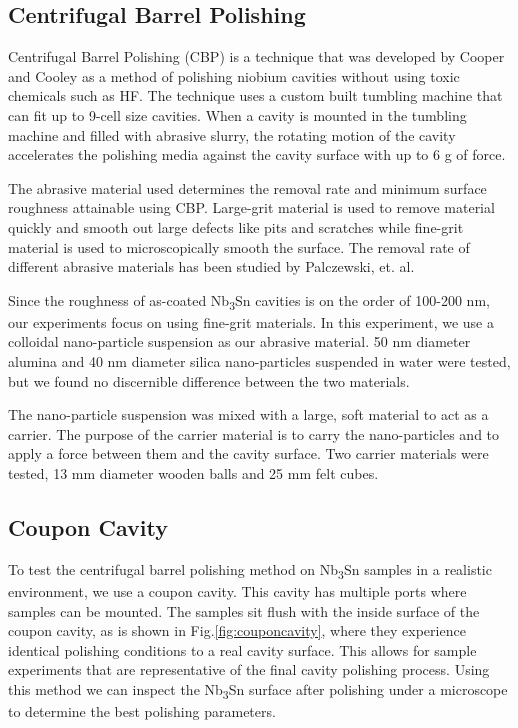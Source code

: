 \documentclass[reprint,amsmath,amssymb,aps]{revtex4-2}%
\begin{document}
\subsection{Centrifugal Barrel Polishing}%
\label{subsec:CentrifugalBarrelPolishing}%
Centrifugal Barrel Polishing (CBP) is a technique that was developed by Cooper and Cooley\cite{cooper2012mirror} as a method of polishing niobium cavities without using toxic chemicals such as HF. The technique uses a custom built tumbling machine that can fit up to 9-cell size cavities. When a cavity is mounted in the tumbling machine and filled with abrasive slurry, the rotating motion of the cavity accelerates the polishing media against the cavity surface with up to 6 g of force. 

The abrasive material used determines the removal rate and minimum surface roughness attainable using CBP. Large-grit material is used to remove material quickly and smooth out large defects like pits and scratches while fine-grit material is used to microscopically smooth the surface. The removal rate of different abrasive materials has been studied by Palczewski, et. al.\cite{palczewski2013exploration}

Since the roughness of as-coated Nb\textsubscript{3}Sn cavities is on the order of 100-200 nm, our experiments focus on using fine-grit materials. In this experiment, we use a colloidal nano-particle suspension as our abrasive material. 50 nm diameter alumina and 40 nm diameter silica nano-particles suspended in water were tested, but we found no discernible difference between the two materials.

The nano-particle suspension was mixed with a large, soft material to act as a carrier. The purpose of the carrier material is to carry the nano-particles and to apply a force between them and the cavity surface. Two carrier materials were tested, 13 mm diameter wooden balls and 25 mm felt cubes.

%
\subsection{Coupon Cavity}%
\label{subsec:couponcavity}%
To test the centrifugal barrel polishing method on Nb\textsubscript{3}Sn samples in a realistic environment, we use a coupon cavity. This cavity has multiple ports where samples can be mounted. The samples sit flush with the inside surface of the coupon cavity, as is shown in Fig.\ref{fig:couponcavity}, where they experience identical polishing conditions to a real cavity surface. This allows for sample experiments that are representative of the final cavity polishing process. Using this method we can inspect the Nb\textsubscript{3}Sn surface after polishing under a microscope to determine the best polishing parameters.
%
\end{document}
